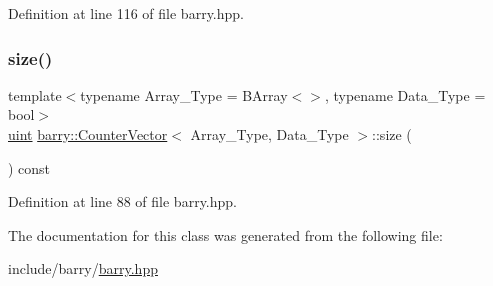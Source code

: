 Definition at line 116 of file barry.\+hpp.

\mbox{\label{classbarry_1_1_counter_vector_a05508f97e15d5a6dd2fdefb2d03060de}} 
\subsubsection{\texorpdfstring{size()}{size()}}
{\footnotesize\ttfamily template$<$typename Array\+\_\+\+Type = B\+Array$<$$>$, typename Data\+\_\+\+Type = bool$>$ \\
\hyperlink{namespacebarry_a11dfc53ddb4672278319aa04f1e09a6c}{uint} \hyperlink{classbarry_1_1_counter_vector}{barry\+::\+Counter\+Vector}$<$ Array\+\_\+\+Type, Data\+\_\+\+Type $>$\+::size (\begin{DoxyParamCaption}{ }\end{DoxyParamCaption}) const\hspace{0.3cm}{\ttfamily [inline]}}



Definition at line 88 of file barry.\+hpp.



The documentation for this class was generated from the following file\+:\begin{DoxyCompactItemize}
\item 
include/barry/\hyperlink{barry_8hpp}{barry.\+hpp}\end{DoxyCompactItemize}
